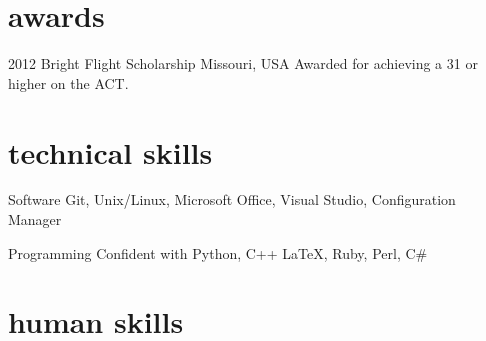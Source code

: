 \documentclass[]{friggeri-cv} %
\begin{document}

\section{awards}

\begin{entrylist}


\entry
{2012}
{Bright Flight Scholarship}
{Missouri, USA} 
{} 
{Awarded for achieving a 31 or higher on the ACT.}



\end{entrylist}


\section{technical skills}

\begin{entrylist}




\entry
{}
{Software}
{}
{}
{
Git, Unix/Linux, Microsoft Office, Visual Studio, Configuration Manager
}



\entry
{}
{Programming}
{}
{}
{
Confident with Python, C++ \LaTeX, Ruby, Perl, C\#
}




\end{entrylist}




\section{human skills}
\end{document}
